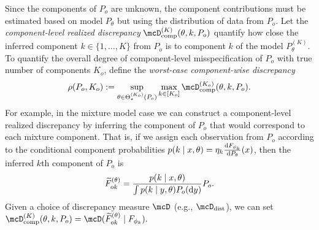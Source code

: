 Since the components of $P_{o}$ are unknown, the component contributions must be estimated based on model $P_{\theta}$ but 
using the distribution of data from $P_{o}$. 
Let the \emph{component-level realized discrepancy} $\compDisc^{(K)}(\theta, k, P_{o})$ quantify
how close the inferred component $k \in \{1,\dots,K\}$ from $P_{o}$ is to component $k$ of the model
$P_{\theta}^{(K)}$. 
To quantify the overall degree of component-level misspecification of $P_o$ with true number of components $K_o$,
define the \emph{worst-case component-wise discrepancy}
\[
 \rho(P_{o}, K_{o}) \defas  \sup_{\theta \in \Theta_{\star}^{(K_{o})}(P_{o})} \max_{k \in [K_{o}]} \compDisc^{(K_{o})}(\theta, k, P_{o}).
\]
For example, in the mixture model case we can construct a component-level realized discrepancy by inferring
the component of $P_o$ that would correspond to each mixture component.
That is, if we assign each observation from $P_o$ according to the conditional component probabilities 
$p(k \mid x, \theta) = \eta_{k} \frac{\mathrm{d} F_{\phi_k}}{\mathrm{d} P_{\theta}}(x)$, 
then the inferred $k$th component of $P_o$ is 
\begin{align}
	\widetilde{F}^{(\theta)}_{ok} = \frac{p(k \mid x, \theta)}{\int p(k \mid y, \theta) P_o(\dee y)} P_o. 
\end{align}
Given a choice of discrepancy measure $\mcD$ (e.g., $\distDisc$), we can set 
$
\compDisc^{(K)}(\theta, k, P_{o}) = \mcD(\widetilde{F}^{(\theta)}_{ok} \mid F_{\phi_k}).
$

